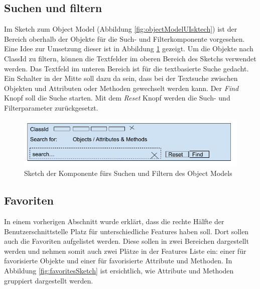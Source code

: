 \subsection{Suchen und filtern}\label{searchandfilterUiSktech}
Im Sketch zum Object Model (Abbildung \ref{fig:objectModelUIsktech}) ist der Bereich oberhalb der Objekte für die Such- und Filterkomponente vorgesehen.
Eine Idee zur Umsetzung dieser ist in Abbildung \ref{fig:searchFilterSketch} gezeigt.
Um die Objekte nach ClassId zu filtern, können die Textfelder im oberen Bereich des Sketchs verwendet werden.
Das Textfeld im unteren Bereich ist für die textbasierte Suche gedacht.
Ein Schalter in der Mitte soll dazu da sein, dass bei der Textsuche zwischen Objekten und Attributen oder Methoden gewechselt werden kann.
Der \textit{Find} Knopf soll die Suche starten.
Mit dem \textit{Reset} Knopf werden die Such- und Filterparameter zurückgesetzt.

\begin{figure}
   \centering
   \includegraphics[width=1.0\textwidth]{gfx/Search _ Filter sketch.png}
   \caption{
      Sketch der Komponente fürs Suchen und Filtern des Object Models
      }
      \label{fig:searchFilterSketch}
\end{figure}

\subsection{Favoriten}\label{uifavorites}
In einem vorherigen Abschnitt wurde erklärt, dass die rechte Hälfte der Benutzerschnittstelle Platz für unterschiedliche Features haben soll.
Dort sollen auch die Favoriten aufgelistet werden.
Diese sollen in zwei Bereichen dargestellt werden und nehmen somit auch zwei Plätze in der Features Liste ein:
einer für favorisierte Objekte und einer für favorisierte Attribute und Methoden.
In Abbildung \ref{fig:favoritesSketch} ist ersichtlich, wie Attribute und Methoden gruppiert dargestellt werden.


